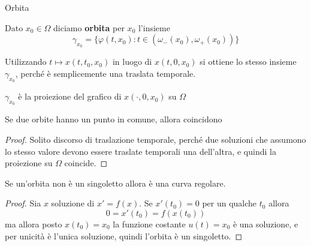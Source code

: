 \begin{definition}{Orbita}

Dato \(x_{0} \in \Omega\) diciamo \textbf{orbita} per \(x_{0}\) l'insieme 
\[
    \gamma_{x_{0}} = \{\varphi {(t, x_{0})} : t \in {(\omega_-{(x_{0})},
    \omega_+{(x_{0})})}\}
\]
\end{definition}
\begin{remark}
    Utilizzando \(t \mapsto x{(t, t_{0},x_{0})}\) in luogo di \(x{(t, 0,
    x_{0})}\) si ottiene lo stesso insieme \(\gamma_{x_{0}}\), perché è
    semplicemente una traslata temporale.
\end{remark}
\begin{note}
    \(\gamma_{x_{0}} \) è la proiezione del grafico di \(x{(\cdot ,0, x_{0})}\)
    su \(\Omega\) 
\end{note}
\begin{proposition}
    Se due orbite hanno un punto in comune, allora coincidono
\end{proposition}
\begin{proof}
    Solito discorso di traslazione temporale, perché due soluzioni che assumono
    lo stesso valore devono essere traslate temporali una dell'altra, e quindi
    la proiezione su \(\Omega\) coincide.
\end{proof}
\begin{proposition}
    Se un'orbita non è un singoletto allora è una curva regolare.
\end{proposition}
\begin{proof}
    Sia \(x\) soluzione di \(x' = f{(x)}\). Se \(x'{(t_{0})} = 0\) per un
    qualche \(t_{0}\) allora
    \[
        0 = x'{(t_{0})} = f{(x{(t_{0})})}
    \]
    ma allora posto \(x{(t_{0})} = x_{0}\) la funzione costante \(u{(t)} =
    x_{0}\) è una soluzione, e per unicità è l'unica soluzione, quindi l'orbita
    è un singoletto.
\end{proof}
